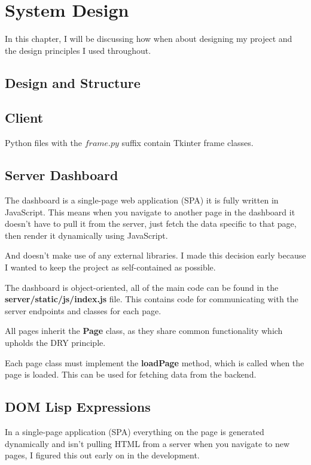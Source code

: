 \chapter{System Design}

In this chapter, I will be discussing how when about designing my project and the design principles I used throughout.

\section{Design and Structure}

\section{Client}
Python files with the $frame.py$ suffix contain Tkinter frame classes.

\section{Server Dashboard}
The dashboard is a single-page web application (SPA) it is fully written in JavaScript.
This means when you navigate to another page in the dashboard it doesn't have to pull it from the server, just fetch the data specific to that page, then render it dynamically using JavaScript.

And doesn't make use of any external libraries.
I made this decision early because I wanted to keep the project as self-contained as possible.

The dashboard is object-oriented, all of the main code can be found in the \textbf{server/static/js/index.js} file.
This contains code for communicating with the server endpoints and classes for each page.

All pages inherit the \textbf{Page} class, as they share common functionality which upholds the DRY principle.


Each page class must implement the \textbf{loadPage} method, which is called when the page is loaded.
This can be used for fetching data from the backend.

\section{DOM Lisp Expressions}
In a single-page application (SPA) everything on the page is generated dynamically and isn't pulling HTML from a server when you navigate to new pages, I figured this out early on in the development.

